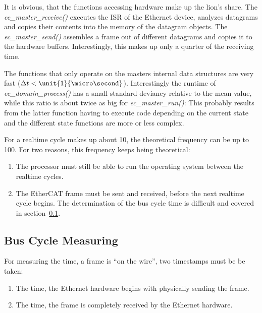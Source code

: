 \documentclass[a4paper,12pt,BCOR6mm,bibtotoc,idxtotoc]{scrbook}
\begin{document}
It is obvious, that the functions accessing hardware make up the
lion's share. The \textit{ec\_master\_receive()} executes the ISR of
the Ethernet device, analyzes datagrams and copies their contents into
the memory of the datagram objects. The \textit{ec\_master\_send()}
assembles a frame out of different datagrams and copies it to the
hardware buffers. Interestingly, this makes up only a quarter of the
receiving time.

The functions that only operate on the masters internal data structures are
very fast ($\Delta t < \unit{1}{\micro\second}$). Interestingly the runtime of
\textit{ec\_domain\_process()} has a small standard deviancy relative to the
mean value, while this ratio is about twice as big for
\textit{ec\_master\_run()}: This probably results from the latter function
having to execute code depending on the current state and the different state
functions are more or less complex.

For a realtime cycle makes up about \unit{10}{\micro\second}, the theoretical
frequency can be up to \unit{100}{\kilo\hertz}. For two reasons, this frequency
keeps being theoretical:

\begin{enumerate}

\item The processor must still be able to run the operating system between the
realtime cycles.

\item The EtherCAT frame must be sent and received, before the next realtime
cycle begins. The determination of the bus cycle time is difficult and covered
in section~\ref{sec:timing-bus}.

\end{enumerate}


\subsection{Bus Cycle Measuring}
\label{sec:timing-bus}

For measuring the time, a frame is ``on the wire'', two timestamps
must be be taken:

\begin{enumerate}
\item The time, the Ethernet hardware begins with physically sending
  the frame.
\item The time, the frame is completely received by the Ethernet
  hardware.
\end{enumerate}
\end{document}
